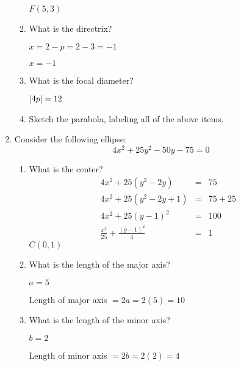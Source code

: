 \documentclass[letterpaper,12pt,fleqn]{article}
\begin{document}
\begin{enumerate}
\begin{enumerate}
    $F(5,3)$
    
  \item What is the directrix?

    $x=2-p=2-3=-1$

    $x=-1$
    
  \item What is the focal diameter?

    $\lvert4p\rvert=12$
    
  \item Sketch the parabola, labeling all of the above items.

    
  \end{enumerate}

\item Consider the following ellipse:
  \[4x^2+25y^2-50y-75=0\]
  \begin{enumerate}
  \item What is the center?
    \begin{eqnarray*}
      4x^2+25(y^2-2y) &=& 75 \\
      4x^2+25(y^2-2y+1) &=& 75+25 \\
      4x^2+25(y-1)^2 &=& 100 \\
      \frac{x^2}{25}+\frac{(y-1)^2}{4} &=& 1
    \end{eqnarray*}
    $C(0,1)$
    
  \item What is the length of the major axis?

    $a=5$

    Length of major axis $=2a=2(5)=10$
    
  \item What is the length of the minor axis?

    $b=2$
    
    Length of minor axis $=2b=2(2)=4$


\end{enumerate}
\end{enumerate}
\end{document}
